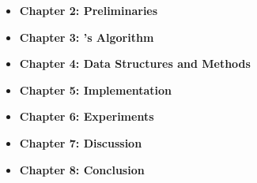 \begin{itemize}
\item \textbf{Chapter 2: Preliminaries} \quad
\item \textbf{Chapter 3: \citeauthor{smith1992}'s Algorithm} \quad 
\item \textbf{Chapter 4: Data Structures and Methods} \quad
\item \textbf{Chapter 5: Implementation} \quad
\item \textbf{Chapter 6: Experiments} \quad
\item \textbf{Chapter 7: Discussion} \quad
\item \textbf{Chapter 8: Conclusion} \quad
\end{itemize}

